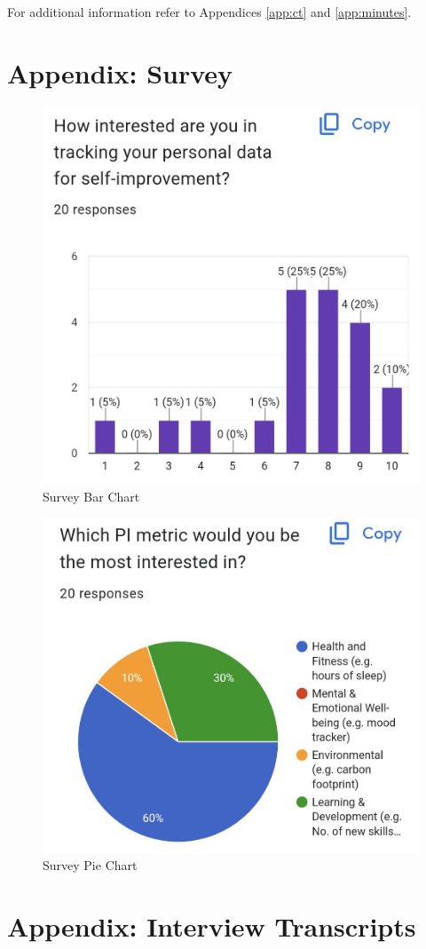 \documentclass[11pt]{article}
\begin{document}
For additional information refer to Appendices \ref{app:ct} and \ref{app:minutes}.

\newpage


\section{Appendix: Survey}\label{app:survey}
\begin{figure}[!ht]
\centering
    \includegraphics[width=0.6\linewidth]{survey1.jpg}
\caption{Survey Bar Chart}
\label{fig:survey1}
\end{figure}
\begin{figure}[!ht]
\centering
    \includegraphics[width=0.6\linewidth]{survey2.jpg}
\caption{Survey Pie Chart}
\label{fig:survey2}
\end{figure}

\newpage


\section{Appendix: Interview Transcripts}\label{app:interviews}
\end{document}
